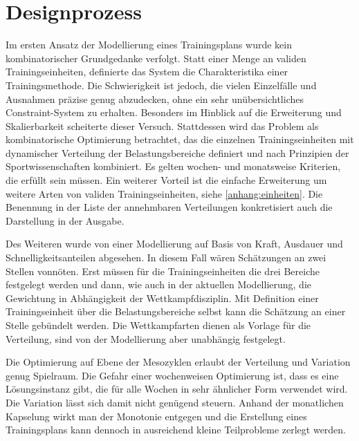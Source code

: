 \section{Designprozess}
Im ersten Ansatz der Modellierung eines Trainingsplans wurde kein kombinatorischer Grundgedanke verfolgt. Statt einer Menge an validen Trainingseinheiten, definierte das System die Charakteristika einer Trainingsmethode. Die Schwierigkeit ist jedoch, die vielen Einzelfälle und Ausnahmen präzise genug abzudecken, ohne ein sehr unübersichtliches Constraint-System zu erhalten. Besonders im Hinblick auf die Erweiterung und Skalierbarkeit scheiterte dieser Versuch. Stattdessen wird das Problem als kombinatorische Optimierung betrachtet, das die einzelnen Trainingseinheiten mit dynamischer Verteilung der Belastungsbereiche definiert und nach Prinzipien der Sportwissenschaften kombiniert. Es gelten wochen- und monatsweise Kriterien, die erfüllt sein müssen. Ein weiterer Vorteil ist die einfache Erweiterung um weitere Arten von validen Trainingseinheiten, siehe \ref{anhang:einheiten}. Die Benennung in der Liste der annehmbaren Verteilungen konkretisiert auch die Darstellung in der Ausgabe. \par
Des Weiteren wurde von einer Modellierung auf Basis von Kraft, Ausdauer und Schnelligkeitsanteilen abgesehen. In diesem Fall wären Schätzungen an zwei Stellen vonnöten. Erst müssen für die Trainingseinheiten die drei Bereiche festgelegt werden und dann, wie auch in der aktuellen Modellierung, die Gewichtung in Abhängigkeit der Wettkampfdisziplin. Mit Definition einer Trainingseinheit über die Belastungsbereiche selbst kann die Schätzung an einer Stelle gebündelt werden. Die Wettkampfarten dienen als Vorlage für die Verteilung, sind von der Modellierung aber unabhängig festgelegt. \par
Die Optimierung auf Ebene der Mesozyklen erlaubt der Verteilung und Variation genug Spielraum. Die Gefahr einer wochenweisen Optimierung ist, dass es eine Lösungsinstanz gibt, die für alle Wochen in sehr ähnlicher Form verwendet wird. Die Variation lässt sich damit nicht genügend steuern. Anhand der monatlichen Kapselung wirkt man der Monotonie entgegen und die Erstellung eines Trainingsplans kann dennoch in ausreichend kleine Teilprobleme zerlegt werden.

